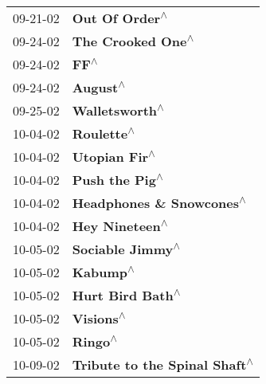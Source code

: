 \begin{supertabular}{p{0.25\columnwidth}p{0.75\columnwidth}}
 09-21-02 &                                                             \textbf{Out Of Order\textsuperscript{$\wedge$}} \\
 09-24-02 &                                                          \textbf{The Crooked One\textsuperscript{$\wedge$}} \\
 09-24-02 &                                                                       \textbf{FF\textsuperscript{$\wedge$}} \\
 09-24-02 &                                                                   \textbf{August\textsuperscript{$\wedge$}} \\
 09-25-02 &                                                             \textbf{Walletsworth\textsuperscript{$\wedge$}} \\
 10-04-02 &                                                                 \textbf{Roulette\textsuperscript{$\wedge$}} \\
 10-04-02 &                                                              \textbf{Utopian Fir\textsuperscript{$\wedge$}} \\
 10-04-02 &                                                             \textbf{Push the Pig\textsuperscript{$\wedge$}} \\
 10-04-02 &                                                  \textbf{Headphones \& Snowcones\textsuperscript{$\wedge$}} \\
 10-04-02 &                                                             \textbf{Hey Nineteen\textsuperscript{$\wedge$}} \\
 10-05-02 &                                                           \textbf{Sociable Jimmy\textsuperscript{$\wedge$}} \\
 10-05-02 &                                                                   \textbf{Kabump\textsuperscript{$\wedge$}} \\
 10-05-02 &                                                           \textbf{Hurt Bird Bath\textsuperscript{$\wedge$}} \\
 10-05-02 &                                                                  \textbf{Visions\textsuperscript{$\wedge$}} \\
 10-05-02 &                                                                    \textbf{Ringo\textsuperscript{$\wedge$}} \\
 10-09-02 &                                              \textbf{Tribute to the Spinal Shaft\textsuperscript{$\wedge$}} \\

\end{supertabular}
